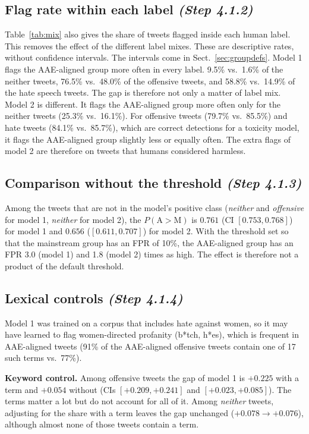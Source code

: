 \documentclass[runningheads,a4paper,oribibl]{llncs}
\begin{document}
\subsection{Flag rate within each label \emph{(Step 4.1.2)}}\label{sec:within}
Table~\ref{tab:mix} also gives the share of tweets flagged inside each human label. This removes
the effect of the different label mixes. These are descriptive rates, without confidence intervals.
The intervals come in Sect.~\ref{sec:groupdefs}.
Model 1 flags the AAE-aligned group more often in every label. 9.5\% vs.\ 1.6\% of the neither
tweets, 76.5\% vs.\ 48.0\% of the offensive tweets, and 58.8\% vs.\ 14.9\% of the hate speech
tweets. The gap is therefore not only a matter of label mix.
Model 2 is different. It flags the AAE-aligned group more often only for the neither tweets
(25.3\% vs.\ 16.1\%). For offensive tweets (79.7\% vs.\ 85.5\%) and hate tweets (84.1\% vs.\ 85.7\%),
which are correct detections for a toxicity model, it flags the AAE-aligned group slightly less
or equally often. The extra flags of model 2 are therefore on tweets that humans considered
harmless.

\subsection{Comparison without the threshold \emph{(Step 4.1.3)}}
Among the tweets that are not in the model's positive class (\emph{neither} and \emph{offensive}
for model 1, \emph{neither} for model 2), the $P(\mathrm{A}{>}\mathrm{M})$ is $0.761$
(CI $[0.753,0.768]$) for model 1 and $0.656$ ($[0.611,0.707]$) for model 2.
With the threshold set so that the mainstream group has an FPR of 10\%, the AAE-aligned group
has an FPR 3.0 (model 1) and 1.8 (model 2) times as high. The effect is therefore not a product
of the default threshold.

\subsection{Lexical controls \emph{(Step 4.1.4)}}\label{sec:words}
Model 1 was trained on a corpus that includes hate against women, so it may have learned to flag
women-directed profanity (b*tch, h*es), which is frequent in AAE-aligned tweets 
(91\% of the AAE-aligned offensive tweets contain one of 17 such terms vs.\ 77\%).

\textbf{Keyword control.} Among offensive tweets the gap of model 1 is $+0.225$ with a term and
$+0.054$ without (CIs $[+0.209,+0.241]$ and $[+0.023,+0.085]$). The terms matter a lot but do
not account for all of it. Among \emph{neither} tweets, adjusting for the share with a term
leaves the gap unchanged ($+0.078\to+0.076$), although almost none of those tweets contain a term. 
\end{document}
